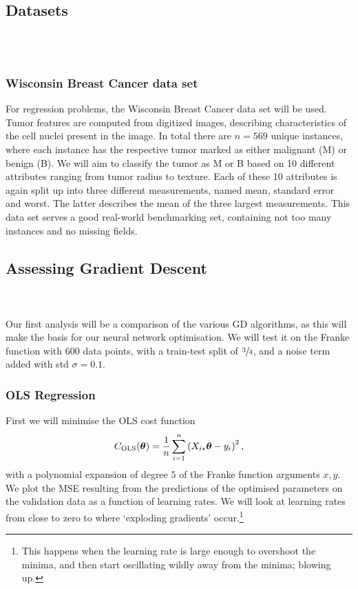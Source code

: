 \\
\subsection{Datasets}
    \\
    \\

    \subsubsection*{Wisconsin Breast Cancer data set}\label{sec:breast_cancer}
    For regression problems, the Wisconsin Breast Cancer data set \cite{Dua:2019} will be used. Tumor features are computed from digitized images, describing characteristics of the cell nuclei present in the image. In total there are $n = 569$ unique instances, where each instance has the respective tumor marked as either malignant (M) or benign (B). We will aim to classify the tumor as M or B based on 10 different attributes ranging from tumor radius to texture. Each of these 10 attributes is again split up into three different measurements, named mean, standard error and worst. The latter describes the mean of the three largest measurements. This data set serves a good real-world benchmarking set, containing not too many instances and no missing fields.  

\subsection{Assessing Gradient Descent}
    \\
    \\
    Our first analysis will be a comparison of the various GD algorithms, as this will make the basis for our neural network optimisation. We will test it on the Franke function with 600 data points, with a train-test split of $\sfrac{3}{4}$, and a noise term added with std $\sigma=0.1$.

    \subsubsection{OLS Regression}
        First we will minimise the OLS cost function
        \begin{align}
            {C}_\text{OLS}(\boldsymbol{\theta}) = \frac{1}{n}\sum_{i=1}^n \left(X_{i*}\boldsymbol{\theta} - y_i\right)^2,
        \end{align}
        with a polynomial expansion of degree $5$ of the Franke function arguments $x,y$. We plot the MSE resulting from the predictions of the optimised parameters on the validation data as a function of learning rates. We will look at learning rates from close to zero to where `exploding gradients' occur.\footnote{This happens when the learning rate is large enough to overshoot the minima, and then start oscillating wildly away from the minima; blowing up.}

